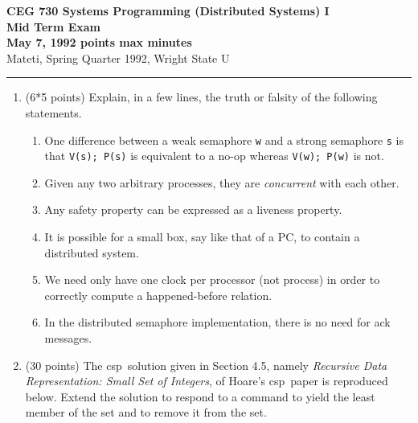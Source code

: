 \def\fat{\framebox[1mm]{\rule{0mm}{2mm}}}
\def\rar{\rightarrow}
\def\pr{$\parallel$}
\def\CSP{{\sc csp}}
\def\RPC{{\sc rpc}}
\parindent=0pt



{\bf CEG 730 Systems Programming (Distributed Systems) I\\[5pt]
\large Mid Term Exam\\[10pt]
May 7, 1992  points max  minutes\\
}
\bigskip
{Mateti,  Spring Quarter 1992, Wright State U}\\[-5pt]
\hrule

\begin{enumerate}

\item (6*5 points)
Explain, in a few lines, the truth or falsity of the following
statements.

\begin{enumerate}

\item One difference between a weak semaphore {\tt w} and a strong
semaphore {\tt s} is that {\tt V(s); P(s)} is equivalent to a no-op
whereas {\tt V(w); P(w)} is not.

\item
Given any two arbitrary processes, they are {\em concurrent}
with each other.

\item
Any safety property can be expressed as a liveness property.

\item It is possible for a small box, say like that of a PC, to
contain a distributed system.

\item We need only have one clock per processor (not process)
in order to correctly compute a happened-before relation.

\item
In the distributed semaphore implementation, there is no need for {\sc ack}
messages.

\end{enumerate}

\item (30 points)
The \CSP\ solution given in Section 4.5, namely {\sl Recursive Data
Representation: Small Set of Integers}, of Hoare's \CSP\ paper is
reproduced below.  Extend the solution to respond to a command to
yield the least member of the set and to remove it from the set.


\end{enumerate}
